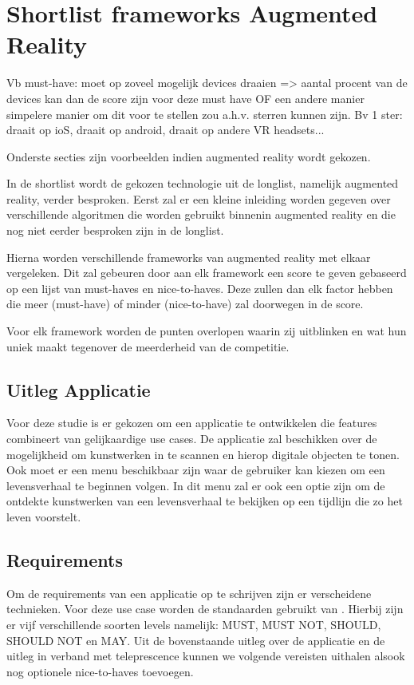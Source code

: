 \chapter{Shortlist frameworks Augmented Reality}
\label{ch:shortlist}

Vb must-have: moet op zoveel mogelijk devices draaien => aantal procent van de devices kan dan de score zijn voor deze must have
OF
een andere manier simpelere manier om dit voor te stellen zou a.h.v. sterren kunnen zijn. Bv 1 ster: draait op ioS, draait op android, draait op andere VR headsets...

Onderste secties zijn voorbeelden indien augmented reality wordt gekozen.


In de shortlist wordt de gekozen technologie uit de longlist, namelijk augmented reality, verder besproken.
Eerst zal er een kleine inleiding worden gegeven over verschillende algoritmen die worden gebruikt binnenin augmented reality en die nog niet eerder besproken zijn in de longlist.

Hierna worden verschillende frameworks van augmented reality met elkaar vergeleken. Dit zal gebeuren door aan elk framework een score te geven gebaseerd op een lijst van must-haves en nice-to-haves. Deze zullen dan elk factor hebben die meer (must-have) of minder (nice-to-have) zal doorwegen in de score.

Voor elk framework worden de punten overlopen waarin zij uitblinken en wat hun uniek maakt tegenover de meerderheid van de competitie.

\section{Uitleg Applicatie}
Voor deze studie is er gekozen om een applicatie te ontwikkelen die features combineert van gelijkaardige use cases. De applicatie zal beschikken over de mogelijkheid om kunstwerken in te scannen en hierop digitale objecten te tonen. Ook moet er een menu beschikbaar zijn waar de gebruiker kan kiezen om een levensverhaal te beginnen volgen. In dit menu zal er ook een optie zijn om de ontdekte kunstwerken van een levensverhaal te bekijken op een tijdlijn die zo het leven voorstelt.

\section{Requirements}
Om de requirements van een applicatie op te schrijven zijn er verscheidene technieken. Voor deze use case worden de standaarden gebruikt van \textcite{Bradner1997}. Hierbij zijn er vijf verschillende soorten levels namelijk: MUST, MUST NOT, SHOULD, SHOULD NOT en MAY. Uit de bovenstaande uitleg over de applicatie en de uitleg in verband met teleprescence kunnen we volgende vereisten uithalen alsook nog optionele nice-to-haves toevoegen.


